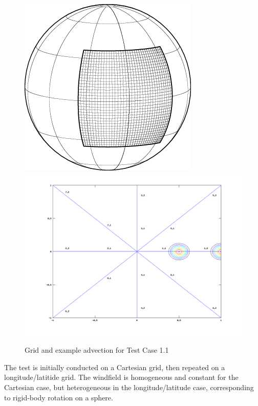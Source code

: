 \begin{figure}[htbp]\vspace*{0cm}\hspace*{0cm}
\includegraphics[angle=0,scale=0.5]{Figures/Apx_Test/LLfig_lowres.png}
\includegraphics[angle=0,scale=0.25]{Figures/Apx_Test/TC1_basemap.png}
\parbox{15cm}{\caption{\label{FigTest_ConvTC1_grid}
Grid and example advection for Test Case 1.1
}}
\end{figure}
The test is initially conducted on a Cartesian grid, then repeated on a longitude/latitide
grid. The windfield is homogeneous and constant for the Cartesian case, but
heterogeneous in the longitude/latitude case, corresponding to rigid-body rotation
on a sphere.

